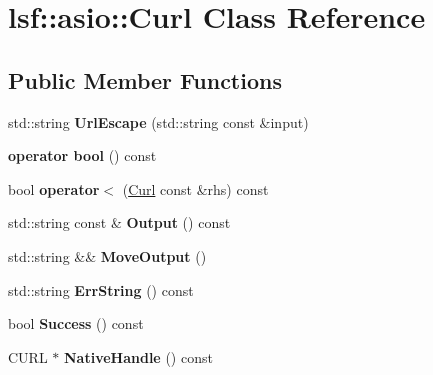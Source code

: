 \hypertarget{classlsf_1_1asio_1_1Curl}{
\section{lsf::asio::Curl Class Reference}
\label{classlsf_1_1asio_1_1Curl}
}
\subsection*{Public Member Functions}
\begin{DoxyCompactItemize}
\item 
\hypertarget{classlsf_1_1asio_1_1Curl_a9f855edc0539b14494bb417fdf09337a}{
std::string {\bfseries UrlEscape} (std::string const \&input)}
\label{classlsf_1_1asio_1_1Curl_a9f855edc0539b14494bb417fdf09337a}

\item 
\hypertarget{classlsf_1_1asio_1_1Curl_ae74733df2bc91aca6ec03a0240293053}{
{\bfseries operator bool} () const }
\label{classlsf_1_1asio_1_1Curl_ae74733df2bc91aca6ec03a0240293053}

\item 
\hypertarget{classlsf_1_1asio_1_1Curl_a89334771b3fb11a739ff87313558966d}{
bool {\bfseries operator$<$} (\hyperlink{classlsf_1_1asio_1_1Curl}{Curl} const \&rhs) const }
\label{classlsf_1_1asio_1_1Curl_a89334771b3fb11a739ff87313558966d}

\item 
\hypertarget{classlsf_1_1asio_1_1Curl_a3fec148c486b1f56b7d6f73240938b77}{
std::string const \& {\bfseries Output} () const }
\label{classlsf_1_1asio_1_1Curl_a3fec148c486b1f56b7d6f73240938b77}

\item 
\hypertarget{classlsf_1_1asio_1_1Curl_a111516e2c6cbaa4447d93d8571a8ea0e}{
std::string \&\& {\bfseries MoveOutput} ()}
\label{classlsf_1_1asio_1_1Curl_a111516e2c6cbaa4447d93d8571a8ea0e}

\item 
\hypertarget{classlsf_1_1asio_1_1Curl_ae8ab39781a9890b4f78004b71d330e5b}{
std::string {\bfseries ErrString} () const }
\label{classlsf_1_1asio_1_1Curl_ae8ab39781a9890b4f78004b71d330e5b}

\item 
\hypertarget{classlsf_1_1asio_1_1Curl_a10832b011681417bf21306d8749a2c59}{
bool {\bfseries Success} () const }
\label{classlsf_1_1asio_1_1Curl_a10832b011681417bf21306d8749a2c59}

\item 
\hypertarget{classlsf_1_1asio_1_1Curl_a944539fbe4bd215f2e4309ec84b7223f}{
CURL $\ast$ {\bfseries NativeHandle} () const }
\label{classlsf_1_1asio_1_1Curl_a944539fbe4bd215f2e4309ec84b7223f}


\end{DoxyCompactItemize}
